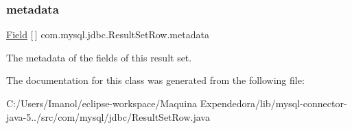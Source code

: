 \subsubsection{\texorpdfstring{metadata}{metadata}}
{\footnotesize\ttfamily \mbox{\hyperlink{classcom_1_1mysql_1_1jdbc_1_1_field}{Field}} \mbox{[}$\,$\mbox{]} com.\+mysql.\+jdbc.\+Result\+Set\+Row.\+metadata\hspace{0.3cm}{\ttfamily [protected]}}

The metadata of the fields of this result set. 

The documentation for this class was generated from the following file\+:\begin{DoxyCompactItemize}
\item 
C\+:/\+Users/\+Imanol/eclipse-\/workspace/\+Maquina Expendedora/lib/mysql-\/connector-\/java-\/5../src/com/mysql/jdbc/Result\+Set\+Row.\+java\end{DoxyCompactItemize}
